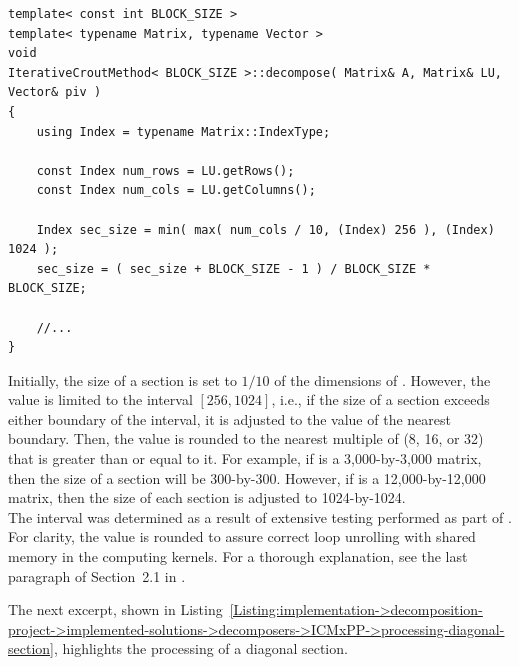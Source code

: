 \begin{lstlisting}[caption={An excerpt from the definition of the overloaded \code{decompose()} method for the ICM\_\textit{x}PP decomposer. This definition matches the declaration shown in Listing~\ref{Listing:implementation->decomposition-project->implemented-solutions->decomposers->ICMxPP->method-declaration-initial-estimate}. The \code{Index} type and dimension-representing variables are included for clarity. The template parameter \code{BLOCK\_SIZE}, equivalent to \textit{x} in ICM\_\textit{x}PP, represents the number of threads in the 1st and 2nd dimensions of a CUDA thread block.},label={Listing:implementation->decomposition-project->implemented-solutions->decomposers->ICMxPP->size-of-sections}]
template< const int BLOCK_SIZE >
template< typename Matrix, typename Vector >
void
IterativeCroutMethod< BLOCK_SIZE >::decompose( Matrix& A, Matrix& LU, Vector& piv )
{
	using Index = typename Matrix::IndexType;
	
	const Index num_rows = LU.getRows();
	const Index num_cols = LU.getColumns();
	
	Index sec_size = min( max( num_cols / 10, (Index) 256 ), (Index) 1024 );
	sec_size = ( sec_size + BLOCK_SIZE - 1 ) / BLOCK_SIZE * BLOCK_SIZE;
	
	//...
}
\end{lstlisting}

Initially, the size of a section is set to $1/10$ of the dimensions of . However, the value is limited to the interval $\left[256, 1024\right]$, i.e., if the size of a section exceeds either boundary of the interval, it is adjusted to the value of the nearest boundary. Then, the value is rounded to the nearest multiple of  (8, 16, or 32) that is greater than or equal to it. For example, if  is a 3,000-by-3,000 matrix, then the size of a section will be 300-by-300. However, if  is a 12,000-by-12,000 matrix, then the size of each section is adjusted to 1024-by-1024.\\
The interval was determined as a result of extensive testing performed as part of  \cite{Cejka2022}. For clarity, the value is rounded to assure correct loop unrolling with shared memory in the computing kernels. For a thorough explanation, see the last paragraph of Section~2.1 in  \cite{Cejka2022}.

The next excerpt, shown in Listing~\ref{Listing:implementation->decomposition-project->implemented-solutions->decomposers->ICMxPP->processing-diagonal-section}, highlights the processing of a diagonal section.

